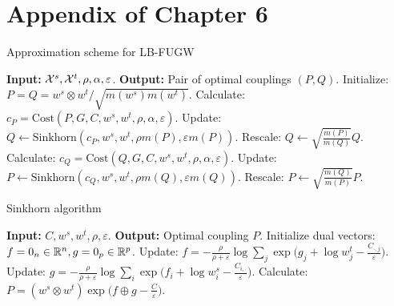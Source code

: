 \section{Appendix of Chapter 6}

\begin{algorithm}[t]
  \caption{Approximation scheme for LB-FUGW}
  \label{alg:lbfugw}
  \begin{algorithmic}[1]
      \STATE \textbf{Input:} $\mathcal X^s, \mathcal X^t, \rho, \alpha, \varepsilon$.
      \STATE \textbf{Output:} Pair of optimal couplings $(P, Q)$.
      \STATE Initialize: $P = Q = w^s \otimes w^t / \sqrt{m(w^s) m(w^t)}$.
          \STATE Calculate: $c_P = \text{Cost}(P,  G, C, w^s, w^t, \rho, \alpha, \varepsilon)$.
          \STATE Update: $Q \gets \text{Sinkhorn}(c_P, w^s, w^t, \rho m(P), \varepsilon m(P))$.
          \STATE Rescale: $Q \gets \sqrt{\frac{m(P)}{m(Q)}} Q$.
          \STATE Calculate: $c_Q = \text{Cost}(Q,  G, C, w^s, w^t, \rho, \alpha, \varepsilon)$.
          \STATE Update: $P \gets \text{Sinkhorn}(c_Q, w^s, w^t, \rho m(Q), \varepsilon m(Q))$.
          \STATE Rescale: $P \gets \sqrt{\frac{m(Q)}{m(P)}} P$.
      \ENDWHILE
  \end{algorithmic}
\end{algorithm}

\begin{algorithm}[t]
  \caption{Sinkhorn algorithm \citep{Sejourne19}}
  \label{alg:sinkhorn}
  \begin{algorithmic}[1]
      \STATE \textbf{Input:} $C, w^s, w^t, \rho, \varepsilon$.
      \STATE \textbf{Output:} Optimal coupling $P$.
      \STATE Initialize dual vectors: $f = 0_n \in \mathbb R^n, g = 0_p \in \mathbb R^p$.
          \STATE Update: $f = -\frac{\rho}{\rho + \varepsilon} \log \sum_j \exp \big( g_j + \log w^t_j - \frac{C_{\cdot,j}}{\varepsilon} \big)$.
        \STATE Update: $g = -\frac{\rho}{\rho + \varepsilon} \log \sum_i \exp \big( f_i + \log w^s_i - \frac{C_{i,\cdot}}{\varepsilon} \big)$.
      \ENDWHILE
      \STATE Calculate: $P = (w^s \otimes w^t) \exp \big(f \oplus g - \frac{C}{\varepsilon} \big)$.
  \end{algorithmic}
\end{algorithm}


